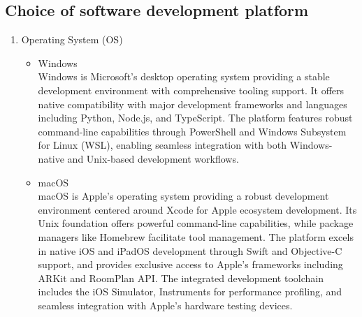 \documentclass[conference]{IEEEtran}
\begin{document}
\subsection{Choice of software development platform}
\begin{enumerate}

\item[1] Operating System (OS)

\begin{itemize}
\item [1)] Windows\\
Windows is Microsoft's desktop operating system providing a stable development environment with comprehensive tooling support. It offers native compatibility with major development frameworks and languages including Python, Node.js, and TypeScript. The platform features robust command-line capabilities through PowerShell and Windows Subsystem for Linux (WSL), enabling seamless integration with both Windows-native and Unix-based development workflows. \\

\item [2)] macOS\\
macOS is Apple's operating system providing a robust development environment centered around Xcode for Apple ecosystem development. Its Unix foundation offers powerful command-line capabilities, while package managers like Homebrew facilitate tool management. The platform excels in native iOS and iPadOS development through Swift and Objective-C support, and provides exclusive access to Apple's frameworks including ARKit and RoomPlan API. The integrated development toolchain includes the iOS Simulator, Instruments for performance profiling, and seamless integration with Apple's hardware testing devices. \\
\end{itemize}
\end{enumerate}
\end{document}
